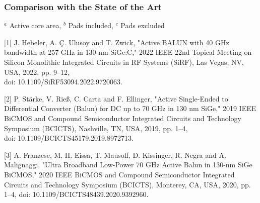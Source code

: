 \documentclass{beamer}
\begin{document}
\begin{frame}
  \frametitle{Comparison with the State of the Art}
 

\begin{table}[h!]
\centering
\footnotesize
{}\par\vspace{0.1pt}
{\scriptsize
$^{a}$ Active core area, \quad
$^{b}$ Pads included, \quad
$^{c}$ Pads excluded
}

\label{tab:comparison}
\end{table}
\vspace{0.2pt}
{\tiny\raggedright
[1] J. Hebeler, A. Ç. Ulusoy and T. Zwick, "Active BALUN with 40 GHz bandwidth at 257 GHz in 130 nm SiGe:C," 2022 IEEE 22nd Topical Meeting on Silicon Monolithic Integrated Circuits in RF Systems (SiRF), Las Vegas, NV, USA, 2022, pp. 9--12,\\ doi: 10.1109/SiRF53094.2022.9720063.\\[2pt]
\raggedright[2] P. Stärke, V. Rieß, C. Carta and F. Ellinger, "Active Single-Ended to Differential Converter (Balun) for DC up to 70 GHz in 130 nm SiGe," 2019 IEEE BiCMOS and Compound Semiconductor Integrated Circuits and Technology Symposium (BCICTS), Nashville, TN, USA, 2019, pp. 1--4,\\ doi: 10.1109/BCICTS45179.2019.8972713.\\[2pt]
\raggedright[3] A. Franzese, M. H. Eissa, T. Mausolf, D. Kissinger, R. Negra and A. Malignaggi, "Ultra Broadband Low-Power 70 GHz Active Balun in 130-nm SiGe BiCMOS," 2020 IEEE BiCMOS and Compound Semiconductor Integrated Circuits and Technology Symposium (BCICTS), Monterey, CA, USA, 2020, pp. 1--4, doi: 10.1109/BCICTS48439.2020.9392960.
\par}
\end{frame}
\end{document}
